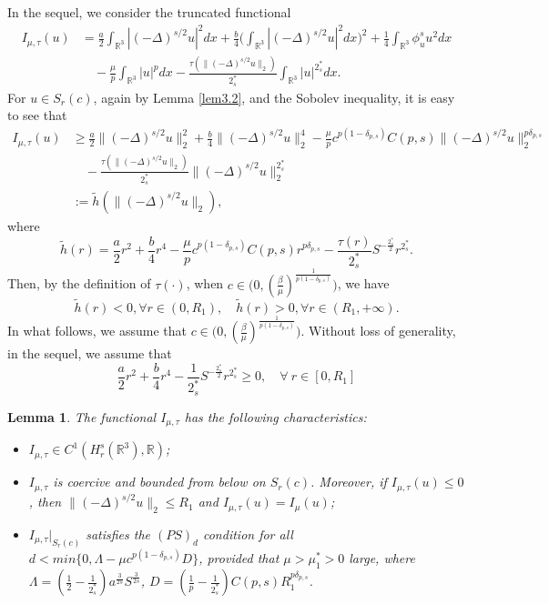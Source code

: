 \documentclass[10pt,a4paper]{amsart}
\numberwithin{equation}{section}
\newtheorem{lemma}[theorem]{Lemma}
\begin{document}
In the sequel, we consider the truncated functional
\begin{equation}
\begin{split}
I_{\mu,\tau}(u)
&= \frac{a}{2}\int_{\mathbb{R}^3}|(-\Delta)^{s/2}u|^2dx+\frac{b}{4}
 \Big(\int_{\mathbb{R}^3}|(-\Delta)^{s/2}u|^2dx\Big)^2
 +\frac{1}{4}\int_{\mathbb{R}^3}\phi^s_u u^2dx\\
&\quad -\frac{\mu}{p}\int_{\mathbb{R}^3}|u|^pdx
 -\frac{\tau(\|(-\Delta)^{s/2}u\|_2)}{2^*_s}\int_{\mathbb{R}^3}|u|^{2^*_s}dx.
\end{split}
\end{equation}
For $u\in S_{r}(c)$, again by Lemma \ref{lem3.2}, and the Sobolev inequality,
it is easy to see that
\begin{align*}
I_{\mu,\tau}(u)
&\geq  \frac{a}{2}\|(-\Delta)^{s/2}u\|^2_2+\frac{b}{4}\|(-\Delta)^{s/2}u\|^4_2
 -\frac{\mu}{p}c^{p(1-\delta_{p,s})}C({p,s})\|(-\Delta)^{s/2}u\|^{p\delta_{p,s}}_2\\
&\quad -\frac{\tau(\|(-\Delta)^{s/2}u\|_2)}{2^*_s}\|(-\Delta)^{s/2}u\|^{2^*_s}_2\\
&:= \tilde{h}(\|(-\Delta)^{s/2}u\|_2),
\end{align*}
where
$$
\tilde{h}(r)=\frac{a}{2}r^2+\frac{b}{4}r^4
-\frac{\mu}{p}c^{p(1-\delta_{p,s})}C({p,s})r^{p\delta_{p,s}}
-\frac{\tau(r)}{2^*_s}S^{-\frac{2^*_s}{2}}r^{2^*_s}.
$$
Then, by the definition of $\tau(\cdot)$, when
$c\in \big(0, (\frac{\beta}{\mu})^{\frac{1}{p(1-\delta_{p, s})}}\big)$, we have
$$
\tilde{h}(r)<0, \forall r\in(0, R_1),\quad
\tilde{h}(r)>0, \forall r\in(R_1, +\infty).
$$
In what follows, we  assume that
$c\in \big(0, (\frac{\beta}{\mu})^{\frac{1}{p(1-\delta_{p, s})}}\big)$.
Without loss of generality, in the sequel, we  assume that
\begin{equation}\label{1.9}
\frac{a}{2}r^2+\frac{b}{4}r^4-\frac{1}{2^*_s}S^{-\frac{2^*_s}{2}}r^{2^*_s}\geq 0,
\quad \forall ~r\in [0, R_1]
\end{equation}

\begin{lemma}\label{lem2.161}
The functional $I_{\mu,\tau}$ has the following characteristics:
\begin{itemize}
\item[(i)] $I_{\mu,\tau} \in C^1(H^s_{r}(\mathbb{R}^3), \mathbb{R})$;

\item[(ii)] $I_{\mu,\tau}$ is coercive and bounded from below on $S_{r}(c)$.
Moreover, if $I_{\mu,\tau}(u)\leq 0$, then $\|(-\Delta)^{s/2}u\|_2\leq R_1$ and
$I_{\mu,\tau}(u)=I_{\mu}(u)$;

\item[(iii)] $ I_{\mu,\tau}|_{S_{r}(c)}$ satisfies the $(PS)_d$ condition for all
$d<min\{0, \Lambda-\mu c^{p(1-\delta_{p,s})}D\}$, provided that $\mu>\mu^*_1>0$
large, where $\Lambda=(\frac{1}{2}-\frac{1}{2^*_s}) a^{\frac{3}{2s}}S^{\frac{3}{2s}}$,
$D=(\frac{1}{p}-\frac{1}{2^*_s})C(p,s)R_1^{p\delta_{p,s}}$.
\end{itemize}
\end{lemma}
\end{document}
